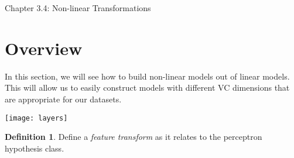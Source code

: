 \documentclass[10pt]{exam}
\theoremstyle{definition}
\newtheorem{defn}{Definition}
\begin{document}
\begin{center}
{
\Huge
Chapter 3.4: Non-linear Transformations
}
\end{center}

\section*{Overview}

In this section, we will see how to build non-linear models out of linear models.
This will allow us to easily construct models with different VC dimensions that are appropriate for our datasets.

\vspace{0.15in}
\texttt{[image: layers]}

\vspace{0.15in}
\begin{defn}
    Define a \emph{feature transform} as it relates to the perceptron hypothesis class.
\end{defn}
\end{document}
